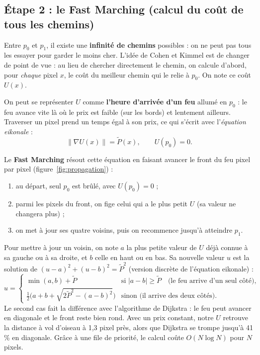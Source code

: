 \documentclass[11pt,a4paper]{article}
\begin{document}
\subsection*{Étape 2 : le Fast Marching (calcul du coût de tous les chemins)}

Entre $p_0$ et $p_1$, il existe une \textbf{infinité de chemins} possibles : on ne peut pas tous les essayer
pour garder le moins cher. L'idée de Cohen et Kimmel est de changer de point de vue : au lieu de chercher
directement le chemin, on calcule d'abord, pour \emph{chaque} pixel $x$, le coût du meilleur chemin qui
le relie à $p_0$. On note ce coût $U(x)$.

On peut se représenter $U$ comme \textbf{l'heure d'arrivée d'un feu} allumé en $p_0$ : le feu avance vite
là où le prix est faible (sur les bords) et lentement ailleurs. Traverser un pixel prend un temps égal à son
prix, ce qui s'écrit avec l'\emph{équation eikonale} :
\begin{equation}
  \|\nabla U(x)\| = \tilde P(x), \qquad U(p_0) = 0 .
\end{equation}

Le \textbf{Fast Marching} résout cette équation en faisant avancer le front du feu pixel par pixel
(figure~\ref{fig:propagation}) :
\begin{enumerate}[nosep,leftmargin=*]
  \item au départ, seul $p_0$ est brûlé, avec $U(p_0)=0$ ;
  \item parmi les pixels du front, on fige celui qui a le plus petit $U$ (sa valeur ne changera plus) ;
  \item on met à jour ses quatre voisins, puis on recommence jusqu'à atteindre $p_1$.
\end{enumerate}
Pour mettre à jour un voisin, on note $a$ la plus petite valeur de $U$ déjà connue à sa gauche ou à sa
droite, et $b$ celle en haut ou en bas. Sa nouvelle valeur $u$ est la solution de
$(u-a)^2 + (u-b)^2 = \tilde P^2$ (version discrète de l'équation eikonale) :
\begin{equation}
  u = \begin{cases}
    \min(a,b) + \tilde P & \text{si } |a-b| \ge \tilde P \quad \text{(le feu arrive d'un seul côté),}\\[3pt]
    \tfrac12\Big(a + b + \sqrt{2\tilde P^2 - (a-b)^2}\Big) & \text{sinon (il arrive des deux côtés).}
  \end{cases}
\end{equation}
Le second cas fait la différence avec l'algorithme de Dijkstra : le feu peut avancer en diagonale et le
front reste bien rond. Avec un prix constant, notre $U$ retrouve la distance à vol d'oiseau à 1,3 pixel
près, alors que Dijkstra se trompe jusqu'à 41\,\% en diagonale. Grâce à une file de priorité, le calcul
coûte $O(N\log N)$ pour $N$ pixels.
\end{document}
